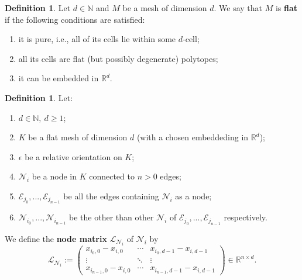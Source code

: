 \documentclass[fleqn]{article}
\theoremstyle{definition}
\newtheorem{definition}[theorem]{Definition}
\begin{document}
\begin{definition}
  Let $d\in \mathbb{N}$ and $M$ be a mesh of dimension $d$.
  We say that $M$ is \textbf{flat} if the following conditions are satisfied:
  \begin{enumerate}
    \item
      it is pure, i.e., all of its cells lie within some $d$-cell;
    \item
      all its cells are flat (but possibly degenerate) polytopes;
    \item
      it can be embedded in $\mathbb{R}^d$.
  \end{enumerate}
\end{definition}

\begin{definition}
  Let:
  \begin{enumerate}
    \item
      $d \in \mathbb{N},\ d \geq 1$;
    \item
      $K$ be a flat mesh of dimension $d$
      (with a chosen embeddeding in $\mathbb{R}^d$);
    \item
      $\epsilon$ be a relative orientation on $K$;
    \item
      $\mathcal{N}_i$ be a node in $K$ connected to $n > 0$ edges;
    \item
      $\mathcal{E}_{j_0}, ..., \mathcal{E}_{j_{n - 1}}$ be all the edges
      containing $\mathcal{N}_i$ as a node;
    \item
      $\mathcal{N}_{i_0}, ..., \mathcal{N}_{i_{n - 1}}$ be the other than
      other $\mathcal{N}_i$ of
      $\mathcal{E}_{j_0}, ..., \mathcal{E}_{j_{n - 1}}$ respectively.
  \end{enumerate}
  We define the \textbf{node matrix} $\mathcal{L}_{\mathcal{N}_i}$ of
  $\mathcal{N}_i$ by
  \begin{equation}
    \mathcal{L}_{\mathcal{N}_i} :=
    \begin{pmatrix}
      x_{i_0, 0} - x_{i, 0} & \cdots & x_{i_0, d - 1} - x_{i, d - 1} \\
      \vdots & \ddots & \vdots \\
      x_{i_{n - 1}, 0} - x_{i, 0} & \cdots & x_{i_{n - 1}, d - 1} - x_{i, d - 1}
    \end{pmatrix}
    \in \mathbb{R}^{n \times d}.
  \end{equation}
\end{definition}
\end{document}
